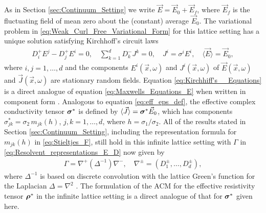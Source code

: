 \documentclass{cmslatex}
\newcommand\bsig{\mbox{\boldmath${\sigma}$}}
\newcommand\brho{\mbox{\boldmath${\rho}$}}
\begin{document}
As in Section \ref{sec:Continuum_Setting} we write
$\vec{E}=\vec{E}_0+\vec{E}_f$, where $\vec{E}_f$ is the fluctuating
field of mean zero about the (constant) average $\vec{E}_0$. 
The variational problem in \eqref{eq:Weak_Curl_Free_Variational_Form}
for this lattice setting has a unique solution satisfying Kirchhoff's
circuit laws \cite{Golden:CMP-473,Bruno:JSP-365}      
%
\begin{align}\label{eq:Kirchhiff's__Equations}
  D_i^+E^j-D_j^+E^i=0, \quad
  \sum_{k=1}^dD_k^-J^k=0, \quad
  J^i=\sigma^iE^i, \quad
  \langle\vec{E}\rangle=\vec{E}_0,
\end{align}
%
where $i,j=1,\ldots,d$ and the components $E^i(\vec{x},\omega)$ and
$J^i(\vec{x},\omega)$ of $\vec{E}(\vec{x},\omega)$ and $\vec{J}(\vec{x},\omega)$ are
stationary random fields.  
Equation \eqref{eq:Kirchhiff's__Equations} is a direct analogue of
equation \eqref{eq:Maxwells_Equations_E} when written in component
form \cite{Golden:CMP-473}. Analogous to equation
\eqref{eq:eff_eps_def}, the effective complex 
conductivity tensor $\bsig^*$ is defined by
$\langle\vec{J}\rangle=\bsig^*\vec{E}_0$, which has components
$\sigma^*_{jk}=\sigma_2\,m_{jk}(h)$, $j,k=1,\ldots,d$, where $h=\sigma_1/\sigma_2$. All of the
results stated in Section \ref{sec:Continuum_Setting}, including the
representation formula for $m_{jk}(h)$ in
\eqref{eq:Stieltjes_F}, still hold in this infinite lattice setting 
with $\Gamma$ in \eqref{eq:Resolvent_representations_E_D} now given by 
%
\begin{align}\label{eq:Discrete_Gamma}
  \Gamma=\nabla^+(\Delta^{-1})\nabla^-, \quad \nabla^\pm = (D_1^\pm,\ldots,D_d^\pm),
\end{align}
%
where $\Delta^{-1}$ is based on discrete convolution with the lattice
Green's function for the Laplacian $\Delta=\nabla^2$ \cite{Bruno:JSP-365}. The
formulation of the ACM for the effective resistivity tensor $\brho^*$
in the infinite lattice setting is a direct analogue of that for
$\bsig^*$ given here.
\end{document}
